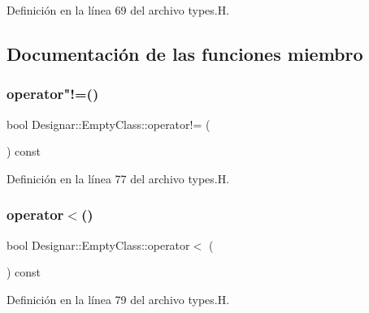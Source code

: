 Definición en la línea 69 del archivo types.\+H.



\subsection{Documentación de las funciones miembro}
\mbox{\label{class_designar_1_1_empty_class_aafdaf95265007ed710e7b2393921d805}} 
\subsubsection{\texorpdfstring{operator"!=()}{operator!=()}}
{\footnotesize\ttfamily bool Designar\+::\+Empty\+Class\+::operator!= (\begin{DoxyParamCaption}\item[{const \hyperlink{class_designar_1_1_empty_class}{Empty\+Class} \&}]{ }\end{DoxyParamCaption}) const\hspace{0.3cm}{\ttfamily [inline]}}



Definición en la línea 77 del archivo types.\+H.

\mbox{\label{class_designar_1_1_empty_class_ae08a3c7c6b6d1d8bd73a52bf4f7be4fb}} 
\subsubsection{\texorpdfstring{operator$<$()}{operator<()}}
{\footnotesize\ttfamily bool Designar\+::\+Empty\+Class\+::operator$<$ (\begin{DoxyParamCaption}\item[{const \hyperlink{class_designar_1_1_empty_class}{Empty\+Class} \&}]{ }\end{DoxyParamCaption}) const\hspace{0.3cm}{\ttfamily [inline]}}



Definición en la línea 79 del archivo types.\+H.


